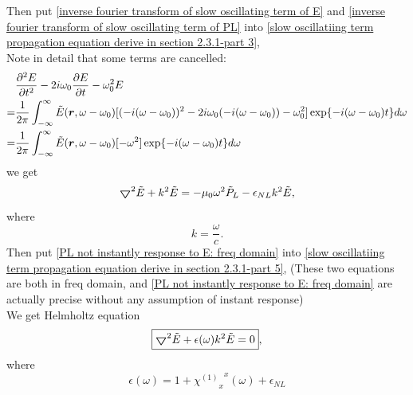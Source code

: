 \documentclass[12pt]{extarticle}
\numberwithin{equation}{section}
\numberwithin{figure}{section}
\numberwithin{table}{section}
\newcommand{\<}{\langle}
\renewcommand{\>}{\rangle}
\theoremstyle{definition}
\newcommand{\Lap}{\boldsymbol{\bigtriangledown}}
\begin{document}
\begin{itemize}
                
                Then put \autoref{inverse fourier transform of slow oscillating term of E} and \autoref{inverse fourier transform of slow oscillating term of PL} into \autoref{slow oscillatiing term propagation equation derive in section 2.3.1-part 3}, \\
                Note in detail that some terms are cancelled:
                \begin{equation}
                \begin{split}
                    &\pdv[2]{E}{t}-2i\omega_0\pdv{E}{t}-\omega_0^2 E\\
                    =&\frac{1}{2\pi}\int_{-\infty}^{\infty}\Tilde{E}(\boldsymbol{r},\omega-\omega_0)[(-i(\omega-\omega_0))^2-2i\omega_0(-i(\omega-\omega_0))-\omega_0^2]\exp{-i(\omega-\omega_0)t}d\omega\\
                    =&\frac{1}{2\pi}\int_{-\infty}^{\infty}\Tilde{E}(\boldsymbol{r},\omega-\omega_0)[-\omega^2]\exp{-i(\omega-\omega_0)t}d\omega
                \end{split}
                \label{slow oscillatiing term propagation equation derive in section 2.3.1-part 4}
                \end{equation}
                we get
                \begin{equation}
                    \Lap^2\Tilde{E}+k^2\Tilde{E}=-\mu_0 \omega^2 \Tilde{P}_L- \epsilon_{NL}k^2\Tilde{E},
                    \label{slow oscillatiing term propagation equation derive in section 2.3.1-part 5}
                \end{equation}
                where
                \begin{equation}
                    k=\frac{\omega}{c}.
                \end{equation}
                Then put \autoref{PL not instantly response to E: freq domain} into \autoref{slow oscillatiing term propagation equation derive in section 2.3.1-part 5}, (These two equations are both in freq domain, and \autoref{PL not instantly response to E: freq domain} are actually precise without any assumption of instant response)\\
                We get Helmholtz equation
                \begin{equation}
                    \boxed{\Lap^2\Tilde{E}+\epsilon(\omega)k^2\Tilde{E}=0},
                    \label{Helmholtz equation in frequency domain}
                \end{equation}
                where
                \begin{equation}
                    \epsilon(\omega)=1+{{\chi^{(1)}}_x}^x(\omega)+\epsilon_{NL}
                    \label{epsilon omega relation to chi1 and epsilon nl}
                \end{equation}
                

\end{itemize}
\end{document}

